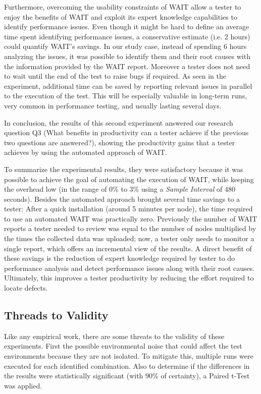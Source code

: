 \documentclass[runningheads,a4paper]{llncs}
\begin{document}
Furthermore, overcoming the usability constraints of WAIT allow a tester
to enjoy the benefits of WAIT and exploit its expert knowledge
capabilities
to identify performance issues.  Even though it might be hard to define an
average time spent identifying performance issues, a conservative estimate (i.e.
2 hours) could quantify WAIT's savings. In our study case, instead of spending 6
hours analyzing the issues, it was possible to identify them and their root
causes with the information provided by the WAIT report. Moreover a tester does
not need to wait until the end of the test to raise bugs if required. As seen in
the experiment, additional time can be saved by reporting relevant issues in
parallel to the execution of the test. This will be especially valuable in
long-term runs, very common in performance testing, and usually lasting several
days.

In conclusion, the results of this second experiment answered our research
question Q3 (What benefits in productivity can a tester achieve if the previous
two questions are answered?), showing the productivity gains that a tester
achieves by using the automated approach of WAIT.

To summarize the experimental results, they were satisfactory because it
was possible to achieve the goal of automating the execution of WAIT,
while keeping the overhead low (in the range of 0\% to 3\% using a \emph{Sample
Interval} of 480 seconds). Besides the automated approach brought several time
savings to a tester: After a quick installation (around 5 minutes per node), the
time required to use an automated WAIT was practically zero. Previously the
number of WAIT reports a tester needed to review was equal to the number of
nodes multiplied by the times the collected data was uploaded; now, a tester
only needs to monitor a single report, which offers an incremental view of the
results. A direct benefit of these savings is the reduction of expert knowledge
required by tester to do performance analysis and detect performance
issues along with their root causes. Ultimately, this improves a tester
productivity by reducing the effort required to locate defects.

\subsection{Threads to Validity}

Like any empirical work, there are some threats to the validity of these
experiments. First the possible environmental noise that could affect the test
environments because they are not isolated. To mitigate this, multiple runs were
executed for each identified combination. Also to determine if the differences
in the results were statistically significant (with 90\% of certainty), a Paired
t-Test was applied.
\end{document}
